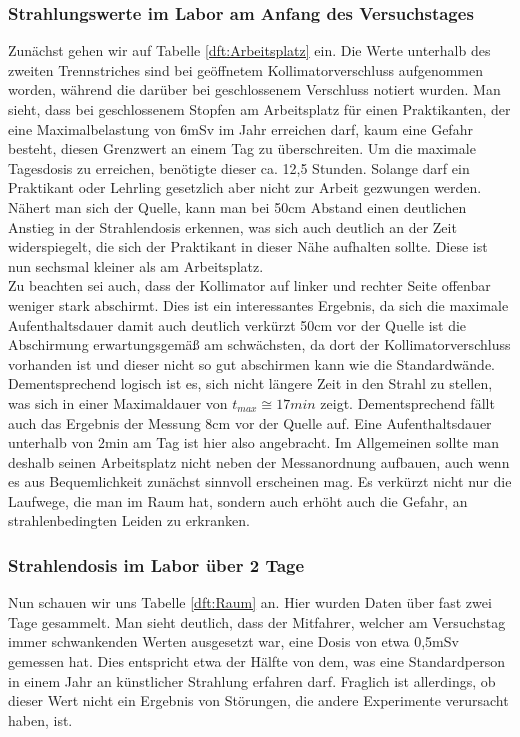 \subsubsection{Strahlungswerte im Labor am Anfang des Versuchstages}
Zunächst gehen wir auf Tabelle \ref{dft:Arbeitsplatz} ein. Die Werte unterhalb des zweiten Trennstriches sind bei 
geöffnetem Kollimatorverschluss aufgenommen worden, während die darüber bei geschlossenem Verschluss notiert wurden. 
Man sieht, dass bei geschlossenem Stopfen  am Arbeitsplatz für einen Praktikanten, der eine Maximalbelastung von 6mSv
 im Jahr erreichen darf, kaum eine Gefahr besteht, diesen Grenzwert an einem Tag zu überschreiten. Um die maximale 
 Tagesdosis zu erreichen, benötigte dieser ca. 12,5 Stunden. Solange darf ein Praktikant oder Lehrling gesetzlich aber 
nicht zur Arbeit gezwungen werden.\\
Nähert man sich der Quelle, kann man bei 50cm Abstand einen deutlichen Anstieg in der Strahlendosis erkennen, was sich 
auch deutlich an der Zeit widerspiegelt, die sich der Praktikant in dieser Nähe aufhalten sollte. Diese ist nun sechsmal
kleiner als am Arbeitsplatz.\\
Zu beachten sei auch, dass der Kollimator auf linker und rechter Seite offenbar weniger stark abschirmt. Dies ist ein 
interessantes Ergebnis, da sich die maximale Aufenthaltsdauer damit auch deutlich verkürzt 50cm vor der Quelle ist die
Abschirmung erwartungsgemäß am schwächsten, da dort der Kollimatorverschluss vorhanden ist und dieser nicht so gut abschirmen
kann wie die Standardwände. Dementsprechend logisch ist es, sich nicht längere Zeit in den Strahl zu stellen, was sich in 
einer Maximaldauer von $t_{max} \cong 17min$ zeigt. Dementsprechend fällt auch das Ergebnis der Messung 8cm vor der Quelle auf. 
Eine Aufenthaltsdauer unterhalb von 2min am Tag ist hier also angebracht.
Im Allgemeinen sollte man deshalb seinen Arbeitsplatz nicht neben der Messanordnung aufbauen, auch wenn es aus Bequemlichkeit 
zunächst sinnvoll erscheinen mag. Es verkürzt nicht nur die Laufwege, die man im Raum hat, sondern auch erhöht auch die Gefahr, 
an strahlenbedingten Leiden zu erkranken.

\subsubsection{Strahlendosis im Labor über 2 Tage}
Nun schauen wir uns Tabelle \ref{dft:Raum} an. Hier wurden Daten über fast zwei Tage gesammelt. Man sieht 
deutlich, dass der Mitfahrer, welcher am Versuchstag immer schwankenden Werten ausgesetzt war, eine Dosis von 
etwa 0,5mSv gemessen hat. Dies entspricht etwa der Hälfte von dem, was eine Standardperson in einem Jahr an 
künstlicher Strahlung erfahren darf. Fraglich ist allerdings, ob dieser Wert nicht ein Ergebnis von Störungen, 
die andere Experimente verursacht haben, ist.  